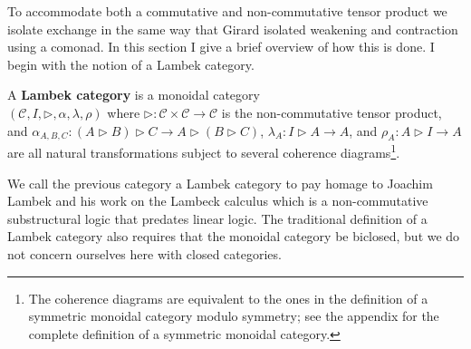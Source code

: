 \documentclass{llncs}
\let\mto\to
\let\to\relax
\newcommand{\to}{\rightarrow}
\newcommand{\cat}[1]{\mathcal{#1}}
\begin{document}

To accommodate both a commutative and non-commutative tensor product
we isolate exchange in the same way that Girard isolated weakening and
contraction using a comonad.  In this section I give a brief overview
of how this is done.  I begin with the notion of a Lambek category.
\begin{definition}
  \label{def:Lambek-category}
  A \textbf{Lambek category} is a monoidal category \\ $(\cat{C}, I,
  \rhd, \alpha, \lambda, \rho)$ where $\rhd : \cat{C} \times \cat{C}
  \mto \cat{C}$ is the non-commutative tensor product, and
  $\alpha_{A,B,C} : (A \rhd B) \rhd C \mto A \rhd (B \rhd C)$,
  $\lambda_A : I \rhd A \mto A$, and $\rho_A : A \rhd I \mto A$ are
  all natural transformations subject to several coherence
  diagrams\footnote{The coherence diagrams are equivalent to the ones
    in the definition of a symmetric monoidal category modulo
    symmetry; see the appendix for the complete definition of a
    symmetric monoidal category.}.
\end{definition}
\noindent
We call the previous category a Lambek category to pay homage to
Joachim Lambek and his work on the Lambeck calculus \cite{Lambek1958}
which is a non-commutative substructural logic that predates linear
logic.  The traditional definition of a Lambek category also requires
that the monoidal category be biclosed, but we do not concern
ourselves here with closed categories.
\end{document}
